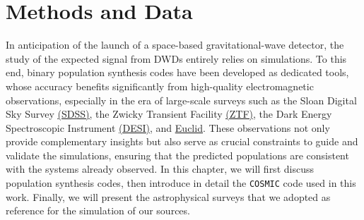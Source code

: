 \chapter{Methods and Data}
In anticipation of the launch of a space-based gravitational-wave detector, the study of the expected signal from DWDs entirely relies on simulations.  
To this end, binary population synthesis codes have been developed as dedicated tools, whose accuracy benefits significantly from high-quality electromagnetic observations, especially in the era of large-scale surveys such as the {Sloan Digital Sky Survey \underline{\href{https://www.sdss.org/}{(SDSS)}}, the Zwicky Transient Facility \underline{\href{https://www.ztf.caltech.edu/}{(ZTF)}}, the Dark Energy Spectroscopic Instrument \underline{\href{https://www.desi.lbl.gov/}{(DESI)}}, and \underline{\href{https://sci.esa.int/web/euclid}{Euclid}}}.  
These observations not only provide complementary insights but also serve as crucial constraints to guide and validate the simulations, ensuring that the predicted populations are consistent with the systems already observed.  
In this chapter, we will first discuss population synthesis codes, then introduce in detail the \texttt{COSMIC} code used in this work. Finally, we will present the astrophysical surveys that we adopted as reference for the simulation of our sources.

